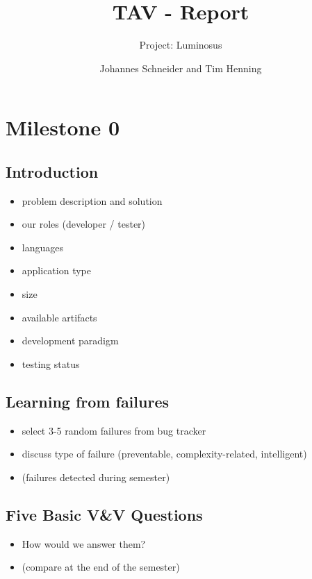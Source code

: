 \documentclass{scrartcl}
\title{TAV - Report}
\subtitle{Project: Luminosus}
\author{Johannes Schneider and Tim Henning}
\begin{document}
\maketitle

\section{Milestone 0}

\subsection{Introduction}

\begin{itemize}
	\item problem description and solution
	\item our roles (developer / tester)
	\item languages
	\item application type
	\item size
	\item available artifacts
	\item development paradigm
	\item testing status
\end{itemize}

\subsection{Learning from failures}

\begin{itemize}
	\item select 3-5 random failures from bug tracker
	\item discuss type of failure (preventable, complexity-related, intelligent)
	\item (failures detected during semester)
\end{itemize}

\subsection{Five Basic V\&V Questions}

\begin{itemize}
	\item How would we answer them?
	\item (compare at the end of the semester)
\end{itemize}
\end{document}
